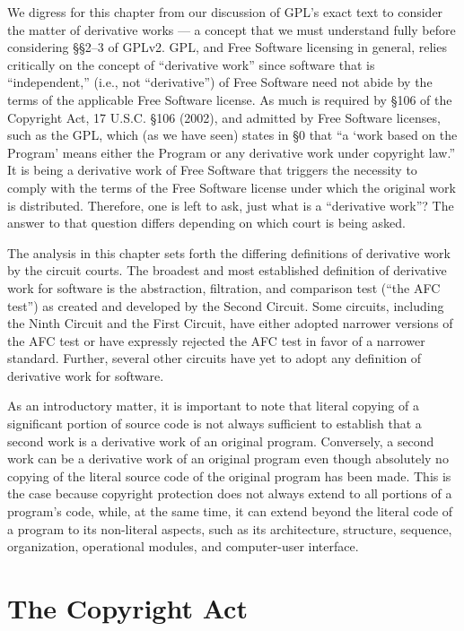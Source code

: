We digress for this chapter from our discussion of GPL's exact text to
consider the matter of derivative works --- a concept that we must
understand fully before considering \S\S 2--3 of GPLv2\@. GPL, and Free
Software licensing in general, relies critically on the concept of
``derivative work'' since software that is ``independent,'' (i.e., not
``derivative'') of Free Software need not abide by the terms of the
applicable Free Software license. As much is required by \S 106 of the
Copyright Act, 17 U.S.C. \S 106 (2002), and admitted by Free Software
licenses, such as the GPL, which (as we have seen) states in \S 0 that ``a
`work based on the Program' means either the Program or any derivative
work under copyright law.'' It is being a derivative work of Free Software
that triggers the necessity to comply with the terms of the Free Software
license under which the original work is distributed. Therefore, one is
left to ask, just what is a ``derivative work''? The answer to that
question differs depending on which court is being asked.

The analysis in this chapter sets forth the differing definitions of
derivative work by the circuit courts. The broadest and most
established definition of derivative work for software is the
abstraction, filtration, and comparison test (``the AFC test'') as
created and developed by the Second Circuit. Some circuits, including
the Ninth Circuit and the First Circuit, have either adopted narrower
versions of the AFC test or have expressly rejected the AFC test in
favor of a narrower standard. Further, several other circuits have yet
to adopt any definition of derivative work for software.

As an introductory matter, it is important to note that literal copying of
a significant portion of source code is not always sufficient to establish
that a second work is a derivative work of an original
program. Conversely, a second work can be a derivative work of an original
program even though absolutely no copying of the literal source code of
the original program has been made. This is the case because copyright
protection does not always extend to all portions of a program's code,
while, at the same time, it can extend beyond the literal code of a
program to its non-literal aspects, such as its architecture, structure,
sequence, organization, operational modules, and computer-user interface.

\section{The Copyright Act}

